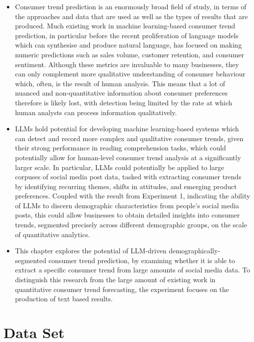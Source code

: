 \documentclass{report}
\begin{document}
\begin{itemize}
\item Consumer trend prediction is an enormously broad field of study, in terms of the approaches and data that are used as well as the types of results that are produced. Much existing work in machine learning-based consumer trend prediction, in particular before the recent proliferation of language models which can synthesise and produce natural language, has focused on making numeric predictions such as sales volume, customer retention, and consumer sentiment. Although these metrics are invaluable to many businesses, they can only complement more qualitative understanding of consumer behaviour which, often, is the result of human analysis. This means that a lot of nuanced and non-quantitative information about consumer preferences therefore is likely lost, with detection being limited by the rate at which human analysts can process information qualitatively.

\item LLMs hold potential for developing machine learning-based systems which can detect and record more complex and qualitative consumer trends, given their strong performance in reading comprehension tasks, which could potentially allow for human-level consumer trend analysis at a significantly larger scale. In particular, LLMs could potentially be applied to large corpuses of social media post data, tasked with extracting consumer trends by identifying recurring themes, shifts in attitudes, and emerging product preferences. Coupled with the result from Experiment 1, indicating the ability of LLMs to discern demographic characteristics from people's social media posts, this could allow businesses to obtain detailed insights into consumer trends, segmented precisely across different demographic groups, on the scale of quantitative analytics.

\item This chapter explores the potential of LLM-driven demographically-segmented consumer trend prediction, by examining whether it is able to extract a specific consumer trend from large amounts of social media data. To distinguish this research from the large amount of existing work in quantitative consumer trend forecasting, the experiment focuses on the production of text based results.
\end{itemize}

\section{Data Set}
\end{document}
